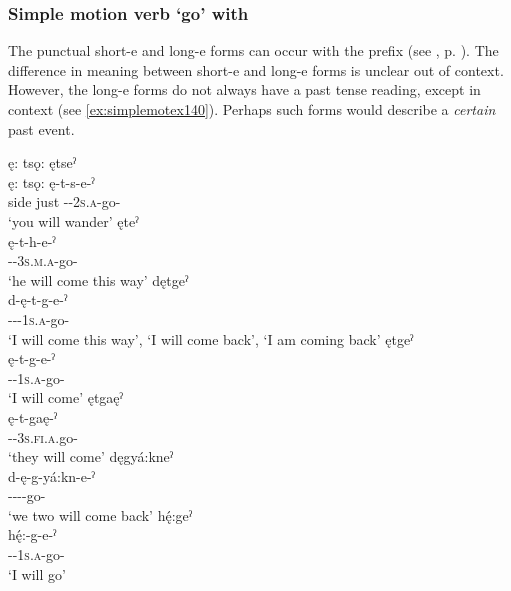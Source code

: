 \subsubsection*{Simple motion verb  ‘go’ with  \textsc{\future}}
The punctual short-e  and long-e  forms can occur with the  \textsc{\future} prefix (see , p. \pageref{figtab:1:purposiveasp}). The difference in meaning between short-e  and long-e  forms is unclear out of context. However, the long-e forms do not always have a past tense reading, except in context (see \ref{ex:simplemotex140}). Perhaps such forms would describe a \emph{certain} past event.

\ea\label{ex:simplemotex13}  
\ea ę: tsǫ: ętseˀ\\
\gll ę: tsǫ: ę-t-s-e-ˀ\\
side just \fut-{\cislocative}-\textsc{2s.a}-go-{\punctual}\\
\glt ‘you will wander’
\ex ęteˀ\\
\gll ę-t-h-e-ˀ\\
 \fut-{\cislocative}-\textsc{3s.m.a}-go-{\punctual}\\
\glt `he will come this way'
\ex dętgeˀ \\
\gll d-ę-t-g-e-ˀ\\
 {\dualic}-{\future}-{\cislocative}-\textsc{1s.a}-go-{\punctual}\\
\glt ‘I will come this way’, ‘I will come back’, `I am coming back'
\ex ętgeˀ\\
\gll ę-t-g-e-ˀ\\
 \fut-{\cislocative}-\textsc{1s.a}-go-{\punctual}\\
\glt `I will come'
\ex ętgaęˀ\\
\gll ę-t-gaę-ˀ\\
 \fut-{\cislocative}-\textsc{3s.fi.a}.go-{\punctual}\\
\glt `they will come'
\ex dęgyá:kneˀ\\
\gll d-ę-g-yá:kn-e-ˀ\\
 {\dualic}-{\future}-{\cislocative}--go-{\punctual}\\
\glt `we two will come back'
\ex hę́:geˀ\\
\gll hę́:-g-e-ˀ\\
 {\translocative}-{\future}-\textsc{1s.a}-go-{\punctual}\\
\glt `I will go'
\z
\z


